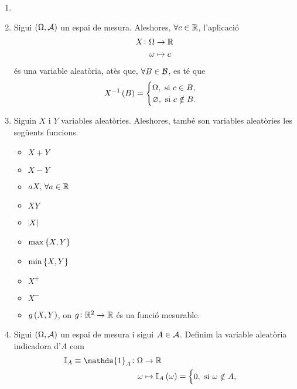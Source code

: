 \begin{example}
    \begin{enumerate}[1.]
        \item[]
        \item Sigui $\left( \Omega, \mathcal{A}\right)$ un espai de mesura. Aleshores, $\forall c\in\mathbb{R}$, l'aplicació
            \begin{align*}
                X\colon \Omega &\to\mathbb{R}\\
                \omega &\mapsto c
            \end{align*}
            és una variable aleatòria, atès que, $\forall B\in\mathcal{B}$, es té que
            \[
                X^{-1}\left( B\right)=\begin{cases}
                    \Omega, \text{ si } c\in B,\\
                    \varnothing, \text{ si } c\notin B.
                \end{cases}
            \]
        \item Siguin $X$ i $Y$ variables aleatòries. Aleshores, també son variables aleatòries les següents funcions.
            \begin{itemize}
                \item $X+Y$
                \item $X-Y$
                \item $aX,\,\forall a\in\mathbb{R}$
                \item $XY$
                \item $\abs{X}$
                \item $\max\left\{ X, Y\right\}$
                \item $\min\left\{ X, Y\right\}$
                \item $X^+$
                \item $X^-$
                \item $g\left( X, Y\right)$, on $g\colon \mathbb{R}^2\to\mathbb{R}$ és ua funció mesurable.
            \end{itemize}
        \item Sigui $\left( \Omega, \mathcal{A}\right)$ un espai de mesura i sigui $A\in\mathcal{A}$. Definim la variable aleatòria indicadora d'$A$ com
            \begin{align*}
                \mathbb{I}_A\equiv\mathds{1}_A\colon \Omega &\to\real\\
                \omega &\mapsto\mathbb{I}_A\lp\omega\rp=\begin{cases}
                    0, \text{ si } \omega\notin A,\\

\end{cases}
\end{align*}
\end{enumerate}
\end{example}

